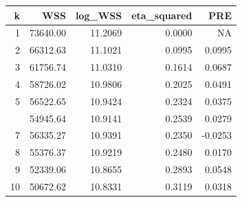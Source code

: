 
\begin{tabular}{rrrrr}
\toprule
k & WSS & log\_WSS & eta\_squared & PRE\\
\midrule
1 & 73640.00 & 11.2069 & 0.0000 & NA\\
2 & 66312.63 & 11.1021 & 0.0995 & 0.0995\\
3 & 61756.74 & 11.0310 & 0.1614 & 0.0687\\
4 & 58726.02 & 10.9806 & 0.2025 & 0.0491\\
5 & 56522.65 & 10.9424 & 0.2324 & 0.0375\\
\addlinespace
6 & 54945.64 & 10.9141 & 0.2539 & 0.0279\\
7 & 56335.27 & 10.9391 & 0.2350 & -0.0253\\
8 & 55376.37 & 10.9219 & 0.2480 & 0.0170\\
9 & 52339.06 & 10.8655 & 0.2893 & 0.0548\\
10 & 50672.62 & 10.8331 & 0.3119 & 0.0318\\
\bottomrule
\end{tabular}
